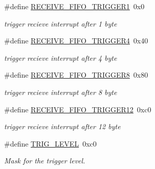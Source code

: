 \begin{DoxyCompactItemize}
\mbox{\label{group__i386__uart_ga22aedff8d60e21c7a527445b7b92acad}} 
\#define \mbox{\hyperlink{group__i386__uart_ga22aedff8d60e21c7a527445b7b92acad}{R\+E\+C\+E\+I\+V\+E\+\_\+\+F\+I\+F\+O\+\_\+\+T\+R\+I\+G\+G\+E\+R1}}~0x0
\begin{DoxyCompactList}\small\item\em trigger recieve interrupt after 1 byte \end{DoxyCompactList}\item 
\mbox{\label{group__i386__uart_gac9303cdc2481259fb0db4152bfffb29a}} 
\#define \mbox{\hyperlink{group__i386__uart_gac9303cdc2481259fb0db4152bfffb29a}{R\+E\+C\+E\+I\+V\+E\+\_\+\+F\+I\+F\+O\+\_\+\+T\+R\+I\+G\+G\+E\+R4}}~0x40
\begin{DoxyCompactList}\small\item\em trigger recieve interrupt after 4 byte \end{DoxyCompactList}\item 
\mbox{\label{group__i386__uart_ga6d938e5d57b9d659a504904c92f869d2}} 
\#define \mbox{\hyperlink{group__i386__uart_ga6d938e5d57b9d659a504904c92f869d2}{R\+E\+C\+E\+I\+V\+E\+\_\+\+F\+I\+F\+O\+\_\+\+T\+R\+I\+G\+G\+E\+R8}}~0x80
\begin{DoxyCompactList}\small\item\em trigger recieve interrupt after 8 byte \end{DoxyCompactList}\item 
\mbox{\label{group__i386__uart_ga7da7fc798cbd875af352818f33cefaf1}} 
\#define \mbox{\hyperlink{group__i386__uart_ga7da7fc798cbd875af352818f33cefaf1}{R\+E\+C\+E\+I\+V\+E\+\_\+\+F\+I\+F\+O\+\_\+\+T\+R\+I\+G\+G\+E\+R12}}~0xc0
\begin{DoxyCompactList}\small\item\em trigger recieve interrupt after 12 byte \end{DoxyCompactList}\item 
\mbox{\label{group__i386__uart_ga90a84f3ea9d75594c6cde52a179b5e88}} 
\#define \mbox{\hyperlink{group__i386__uart_ga90a84f3ea9d75594c6cde52a179b5e88}{T\+R\+I\+G\+\_\+\+L\+E\+V\+EL}}~0xc0
\begin{DoxyCompactList}\small\item\em Mask for the trigger level. \end{DoxyCompactList}\end{DoxyCompactItemize}
